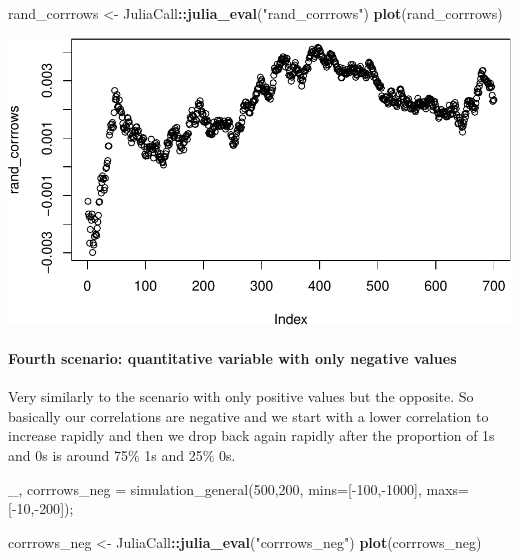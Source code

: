 \documentclass[]{article}
\newenvironment{Shaded}{\begin{snugshade}}{\end{snugshade}}
\newcommand{\FloatTok}[1]{\textcolor[rgb]{0.00,0.00,0.81}{#1}}
\newcommand{\KeywordTok}[1]{\textcolor[rgb]{0.13,0.29,0.53}{\textbf{#1}}}
\newcommand{\NormalTok}[1]{#1}
\newcommand{\OperatorTok}[1]{\textcolor[rgb]{0.81,0.36,0.00}{\textbf{#1}}}
\newcommand{\StringTok}[1]{\textcolor[rgb]{0.31,0.60,0.02}{#1}}
\let\oldparagraph\paragraph
\renewcommand{\paragraph}[1]{\oldparagraph{#1}\mbox{}}
\begin{document}
\begin{Shaded}
\begin{Highlighting}[]
\NormalTok{rand_corrrows <-}\StringTok{ }\NormalTok{JuliaCall}\OperatorTok{::}\KeywordTok{julia_eval}\NormalTok{(}\StringTok{"rand_corrrows"}\NormalTok{)}
\KeywordTok{plot}\NormalTok{(rand_corrrows)}
\end{Highlighting}
\end{Shaded}

\includegraphics{./figures/unnamed-chunk-18-1.pdf}

\newpage

\hypertarget{fourth-scenario-quantitative-variable-with-only-negative-values}{%
\paragraph{Fourth scenario: quantitative variable with only negative
values}\label{fourth-scenario-quantitative-variable-with-only-negative-values}}

Very similarly to the scenario with only positive values but the
opposite. So basically our correlations are negative and we start with a
lower correlation to increase rapidly and then we drop back again
rapidly after the proportion of 1s and 0s is around 75\% 1s and 25\% 0s.

\begin{Shaded}
\begin{Highlighting}[]
\NormalTok{_, corrrows_neg = simulation_general(}\FloatTok{500}\NormalTok{,}\FloatTok{200}\NormalTok{, mins=[-}\FloatTok{100}\NormalTok{,-}\FloatTok{1000}\NormalTok{], maxs=[-}\FloatTok{10}\NormalTok{,-}\FloatTok{200}\NormalTok{]);}
\end{Highlighting}
\end{Shaded}

\begin{Shaded}
\begin{Highlighting}[]
\NormalTok{corrrows_neg <-}\StringTok{ }\NormalTok{JuliaCall}\OperatorTok{::}\KeywordTok{julia_eval}\NormalTok{(}\StringTok{"corrrows_neg"}\NormalTok{)}
\KeywordTok{plot}\NormalTok{(corrrows_neg)}
\end{Highlighting}
\end{Shaded}
\end{document}
